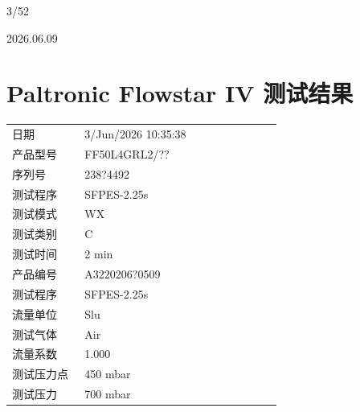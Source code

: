 \documentclass[UTF8,10pt,a4paper,fontset=fandol]{ctexart}
\newcommand{\fieldvalue}[1]{#1}
\newcommand{\handwritten}[1]{#1}
\begin{document}
\handwritten{3/52}

\handwritten{2026.06.09}


\newpage

\section{Paltronic Flowstar IV 测试结果}

\begin{tabular}{@{}p{0.25\linewidth}p{0.68\linewidth}@{}}
日期 &
\fieldvalue{3/Jun/2026 10:35:38}
\\
产品型号 &
\fieldvalue{FF50L4GRL2/??}
\\
序列号 &
\fieldvalue{238?4492}
\\
测试程序 &
\fieldvalue{SFPES-2.25s}
\\
测试模式 &
\fieldvalue{WX}
\\
测试类别 &
\fieldvalue{C}
\\
测试时间 &
\fieldvalue{2 min}
\\
产品编号 &
\fieldvalue{A3220206?0509}
\\
测试程序 &
\fieldvalue{SFPES-2.25s}
\\
流量单位 &
\fieldvalue{Slu}
\\
测试气体 &
\fieldvalue{Air}
\\
流量系数 &
\fieldvalue{1.000}
\\
测试压力点 &
\fieldvalue{450 mbar}
\\
测试压力 &
\fieldvalue{700 mbar}
\end{tabular}
\end{document}
